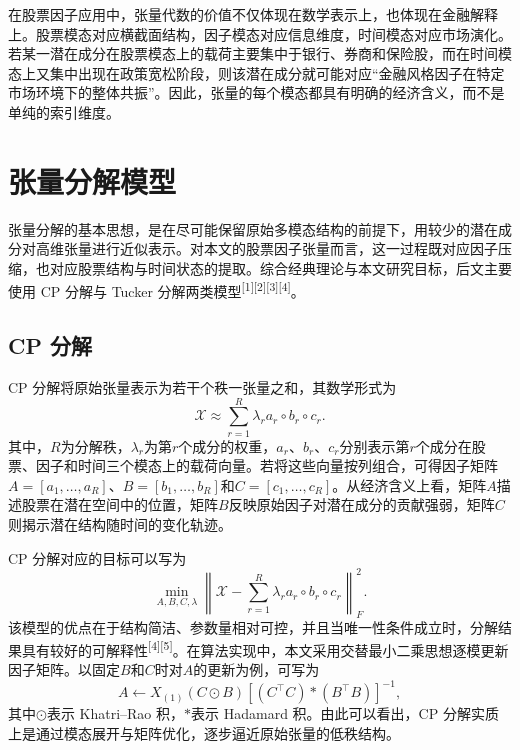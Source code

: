 在股票因子应用中，张量代数的价值不仅体现在数学表示上，也体现在金融解释上。股票模态对应横截面结构，因子模态对应信息维度，时间模态对应市场演化。若某一潜在成分在股票模态上的载荷主要集中于银行、券商和保险股，而在时间模态上又集中出现在政策宽松阶段，则该潜在成分就可能对应“金融风格因子在特定市场环境下的整体共振”。因此，张量的每个模态都具有明确的经济含义，而不是单纯的索引维度。

\section{张量分解模型}

张量分解的基本思想，是在尽可能保留原始多模态结构的前提下，用较少的潜在成分对高维张量进行近似表示。对本文的股票因子张量而言，这一过程既对应因子压缩，也对应股票结构与时间状态的提取。综合经典理论与本文研究目标，后文主要使用 CP 分解与 Tucker 分解两类模型\textsuperscript{[1][2][3][4]}。

\subsection{CP 分解}

CP 分解将原始张量表示为若干个秩一张量之和，其数学形式为
\begin{equation}
\mathcal{X}\approx \sum_{r=1}^{R}\lambda_r a_r\circ b_r\circ c_r.
\end{equation}
其中，$R$为分解秩，$\lambda_r$为第$r$个成分的权重，$a_r$、$b_r$、$c_r$分别表示第$r$个成分在股票、因子和时间三个模态上的载荷向量。若将这些向量按列组合，可得因子矩阵$A=[a_1,\ldots,a_R]$、$B=[b_1,\ldots,b_R]$和$C=[c_1,\ldots,c_R]$。从经济含义上看，矩阵$A$描述股票在潜在空间中的位置，矩阵$B$反映原始因子对潜在成分的贡献强弱，矩阵$C$则揭示潜在结构随时间的变化轨迹。

CP 分解对应的目标可以写为
\begin{equation}
\min_{A,B,C,\lambda}\left\|\mathcal{X}-\sum_{r=1}^{R}\lambda_r a_r\circ b_r\circ c_r\right\|_F^2.
\end{equation}
该模型的优点在于结构简洁、参数量相对可控，并且当唯一性条件成立时，分解结果具有较好的可解释性\textsuperscript{[4][5]}。在算法实现中，本文采用交替最小二乘思想逐模更新因子矩阵。以固定$B$和$C$时对$A$的更新为例，可写为
\begin{equation}
A\leftarrow X_{(1)}(C\odot B)\left[(C^{\top}C)\ast(B^{\top}B)\right]^{-1},
\end{equation}
其中$\odot$表示 Khatri--Rao 积，$\ast$表示 Hadamard 积。由此可以看出，CP 分解实质上是通过模态展开与矩阵优化，逐步逼近原始张量的低秩结构。

